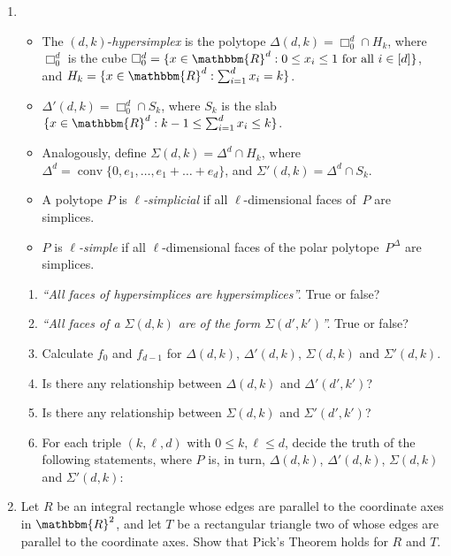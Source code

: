 \documentclass[11pt]{amsart}
\newcommand{\R}{\mathbbm{R}}
\DeclareMathOperator{\conv}{conv}
\begin{document}
\begin{enumerate}
\setlength{\itemsep}{1ex}
\item 
    \begin{itemize}
    \item The $(d,k)$-\emph{hypersimplex} is the polytope $\Delta(d,k)=\Box_0^d\cap H_k$, where $\Box_0^d$ is the cube $\Box_0^d = \{x\in\R^d: 0\le x_i\le 1\text{ for all }i\in[d]\}$, and
$H_k=\{x\in\R^d:\sum_{i=1}^d x_i = k\}$.
\item $\Delta'(d,k)=\Box_0^d\cap S_k$, where $S_k$ is the slab $\{x\in\R^d : k-1\le\sum_{i=1}^d x_i \le k\}$.
\item Analogously, define $\Sigma(d,k)=\Delta^d\cap H_k$, where $\Delta^d=\conv\{0,e_1,\dots,e_1+\dots+e_d\}$, and $\Sigma'(d,k) = \Delta^d\cap S_k$.
\item A polytope $P$ is \emph{$\ell$-simplicial} if all $\ell$-dimensional faces of~$P$ are simplices.
\item $P$ is \emph{$\ell$-simple} if all $\ell$-dimensional faces of the polar polytope~$P^\Delta$ are simplices.
    \end{itemize}


\bigskip
\begin{enumerate}
\setlength{\itemsep}{1ex}
\item \emph{``All faces of hypersimplices are hypersimplices''.} True or false? 

\item \emph{``All faces of a $\Sigma(d,k)$ are of the form $\Sigma(d',k')$''.} True or false? 

\item Calculate $f_0$ and $f_{d-1}$ for $\Delta(d,k)$, $\Delta'(d,k)$, $\Sigma(d,k)$ and $\Sigma'(d,k)$.

\item Is there any relationship between $\Delta(d,k)$ and $\Delta'(d',k')$?

\item Is there any relationship between $\Sigma(d,k)$ and $\Sigma'(d',k')$?

\item For each triple $(k,\ell,d)$ with $0\le k,\ell\le d$, decide the truth of the following statements, where $P$ is, in turn, $\Delta(d,k)$, $\Delta'(d,k)$, $\Sigma(d,k)$ and $\Sigma'(d,k)$:

\end{enumerate}

\item Let $R$ be an integral rectangle whose edges are parallel to the coordinate axes in $\R^2$, and let $T$ be a rectangular triangle two of whose edges are parallel to the coordinate axes. Show that Pick's Theorem holds for $R$ and $T$.
\end{enumerate}
\end{document}
